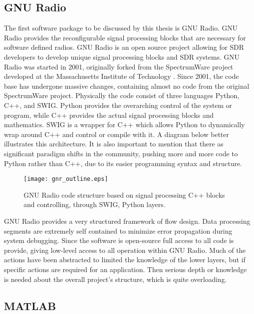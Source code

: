 \subsection{GNU Radio}

The first software package to be discussed by this thesis is GNU Radio.  GNU Radio provides the reconfigurable signal processing blocks that are necessary for software defined radios. GNU Radio is an open source project allowing for SDR developers to develop unique signal processing blocks and SDR systems.  GNU Radio was started in 2001, originally forked from the SpectrumWare project developed at the Massachusetts Institute of Technology \cite{spectrumware}.  Since 2001, the code base has undergone massive changes, containing almost no code from the original SpectrumWare project.  Physically the code consist of three languages Python, C++, and SWIG.  Python provides the overarching control of the system or program, while C++ provides the actual signal processing blocks and mathematics.  SWIG is a wrapper for C++ which allows Python to dynamically wrap around C++ and control or compile with it.  A diagram below better illustrates this architecture.  It is also important to mention that there as significant paradigm shifts in the community, pushing more and more code to Python rather than C++, due to its easier programming syntax and structure.\\

\begin{figure}
\centering
\texttt{[image: gnr\_outline.eps]}
\caption{GNU Radio code structure based on signal processing C++ blocks and controlling, through SWIG, Python layers.}
\label{gnr_struct}
\end{figure}

GNU Radio provides a very structured framework of flow design.  Data processing segments are extremely self contained to minimize error propagation during system debugging.  Since the software is open-source full access to all code is provide, giving low-level access to all operation within GNU Radio.  Much of the actions have been abstracted to limited the knowledge of the lower layers, but if specific actions are required for an application.  Then serious depth or knowledge is needed about the overall project's structure, which is quite overloading.\\

\subsection{MATLAB}

